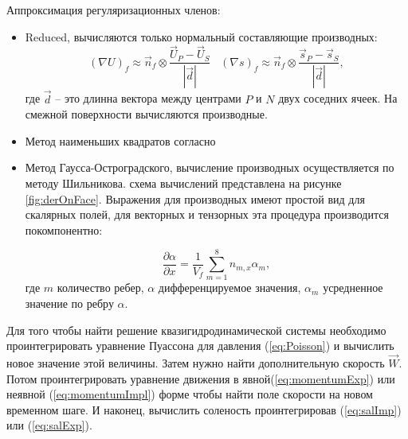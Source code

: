 Аппроксимация регуляризационных членов:

\begin{itemize}
    \item Reduced, вычисляются только нормальный составляющие производных:
    \begin{equation}
        (\nabla U)_f \approx \vec{n}_f \otimes \frac{\vec{U}_{P}-\vec{U}_{S}}{|\vec{d}|} \,\,\,\,\,
        (\nabla s)_f \approx \vec{n}_f \otimes \frac{\vec{s}_{P}-\vec{s}_{S}}{|\vec{d}|},
    \end{equation}
    где $\vec{d}$ -- это длинна вектора между центрами $P$ и $N$ двух соседних ячеек. На смежной поверхности вычисляются производные.
    
    \item Метод наименьших квадратов согласно\cite{Kraposhin2017}%
    \item Метод Гаусса-Остроградского, вычисление производных осуществляется по методу Шильникова\cite{Istomina2019}. схема вычислений представлена на рисунке  \ref{fig:derOnFace}. Выражения для производных имеют простой вид для скалярных полей, для векторных и тензорных эта процедура производится покомпонентно:
    
    \begin{equation}
        \frac{\partial \alpha}{\partial x} = \frac{1}{V_f} \sum_{m=1}^8 n_{m,x} \alpha_m,
    \end{equation}
    где $m$ количество ребер, $\alpha$ дифференцируемое значения, $\alpha_m$ усредненное значение по ребру $\alpha$.
\end{itemize}

Для того чтобы найти решение квазигидродинамической системы необходимо проинтегрировать уравнение Пуассона для давления (\ref{eq:Poisson}) и вычислить новое значение этой величины. Затем нужно найти дополнительную скорость $\vec{W}$. Потом проинтегрировать уравнение движения в явной(\ref{eq:momentumExp}) или неявной (\ref{eq:momentumImpl}) форме чтобы найти поле скорости на новом временном шаге. И наконец, вычислить соленость проинтегрировав (\ref{eq:salImp}) или (\ref{eq:salExp}).
    
    
